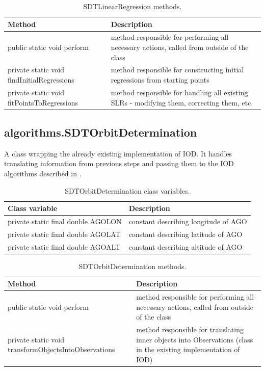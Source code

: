 \begin{table}[H]
\centering
\setlength{\extrarowheight}{2pt}
\begin{tabularx}{\textwidth}{|X|X|}
\hline
\textbf{Method} & \textbf{Description} \\ \hline
public static void \mbox{perform} & method responsible for performing all necessary actions, called from outside of the class \\ \hline
private static void \mbox{findInitialRegressions} & method responsible for constructing initial regressions from starting points\\ \hline
private static void \mbox{fitPointsToRegressions} & method responsible for handling all existing SLRs - modifying them, correcting them, etc.\\ \hline
\end{tabularx}
\caption{SDTLinearRegression methods.}
\label{tab:class_methods_LR}
\end{table}

\newpage

\subsection{algorithms.SDTOrbitDetermination}

	A class wrapping the already existing implementation of IOD. It handles translating information from previous steps and passing them to the IOD algorithms described in .
	
\begin{table}[H]
\centering
\setlength{\extrarowheight}{2pt}
\begin{tabularx}{\textwidth}{|X|X|}
\hline
\textbf{Class variable} & \textbf{Description} \\ \hline
private static final double \mbox{AGOLON} & constant describing longitude of AGO \\ \hline
private static final double \mbox{AGOLAT} & constant describing latitude of AGO\\ \hline
private static final double \mbox{AGOALT} & constant describing altitude of AGO\\ \hline
\end{tabularx}
\caption{SDTOrbitDetermination class variables.}
\label{tab:class_variables_OD}
\end{table}

\begin{table}[H]
\centering
\setlength{\extrarowheight}{2pt}
\begin{tabularx}{\textwidth}{|X|X|}
\hline
\textbf{Method} & \textbf{Description} \\ \hline
public static void \mbox{perform} & method responsible for performing all necessary actions, called from outside of the class \\ \hline
private static void \mbox{transformObjectsIntoObservations} & method responsible for translating inner objects into Observations (class in the existing implementation of IOD)\\ \hline
\end{tabularx}
\caption{SDTOrbitDetermination methods.}
\label{tab:class_methods_OD}
\end{table}

